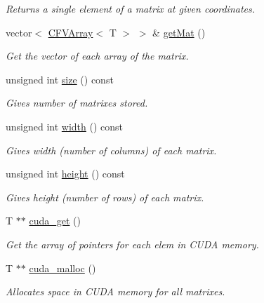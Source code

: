 \begin{DoxyCompactItemize}
\begin{DoxyCompactList}\small\item\em Returns a single element of a matrix at given coordinates. \item\end{DoxyCompactList}\item 
vector$<$ \hyperlink{classFVL_1_1CFVArray}{CFVArray}$<$ T $>$ $>$ \& \hyperlink{classFVL_1_1CFVMat_a434d97b662d1620513d0f27ecd0e9b1e}{getMat} ()
\begin{DoxyCompactList}\small\item\em Get the vector of each array of the matrix. \item\end{DoxyCompactList}\item 
unsigned int \hyperlink{classFVL_1_1CFVMat_a90ca964ebcc1b02bbcde225edd49e812}{size} () const 
\begin{DoxyCompactList}\small\item\em Gives number of matrixes stored. \item\end{DoxyCompactList}\item 
unsigned int \hyperlink{classFVL_1_1CFVMat_a7b736ec9a05be5c498760d35a0406ed3}{width} () const 
\begin{DoxyCompactList}\small\item\em Gives width (number of columns) of each matrix. \item\end{DoxyCompactList}\item 
unsigned int \hyperlink{classFVL_1_1CFVMat_aa420a28166e708e3f8b9ecc8e527fc09}{height} () const 
\begin{DoxyCompactList}\small\item\em Gives height (number of rows) of each matrix. \item\end{DoxyCompactList}\item 
T $\ast$$\ast$ \hyperlink{classFVL_1_1CFVMat_a8b296b3ae7f031dac8aecc13b0bf39fc}{cuda\_\-get} ()
\begin{DoxyCompactList}\small\item\em Get the array of pointers for each elem in CUDA memory. \item\end{DoxyCompactList}\item 
T $\ast$$\ast$ \hyperlink{classFVL_1_1CFVMat_a09eadb0032c2862e02ddaf42732533f0}{cuda\_\-malloc} ()
\begin{DoxyCompactList}\small\item\em Allocates space in CUDA memory for all matrixes. \item\end{DoxyCompactList}\item 

\end{DoxyCompactItemize}
